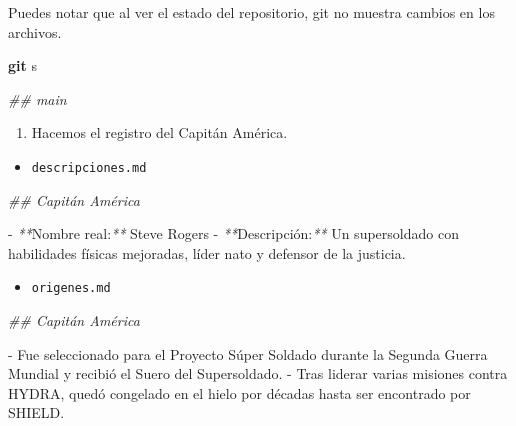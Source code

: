 \documentclass[
]{book}
\newenvironment{Shaded}{\begin{snugshade}}{\end{snugshade}}
\newcommand{\CommentTok}[1]{\textcolor[rgb]{0.56,0.35,0.01}{\textit{#1}}}
\newcommand{\ExtensionTok}[1]{#1}
\newcommand{\FunctionTok}[1]{\textcolor[rgb]{0.13,0.29,0.53}{\textbf{#1}}}
\newcommand{\NormalTok}[1]{#1}
\newcommand{\PreprocessorTok}[1]{\textcolor[rgb]{0.56,0.35,0.01}{\textit{#1}}}
\providecommand{\tightlist}{%
  \setlength{\itemsep}{0pt}\setlength{\parskip}{0pt}}
\begin{document}
Puedes notar que al ver el estado del repositorio, git no muestra cambios en los archivos.

\begin{Shaded}
\begin{Highlighting}[]
\FunctionTok{git}\NormalTok{ s}
\end{Highlighting}
\end{Shaded}

\begin{Shaded}
\begin{Highlighting}[]
\CommentTok{\#\# main}
\end{Highlighting}
\end{Shaded}

\begin{enumerate}
\def\labelenumi{\arabic{enumi}.}
\setcounter{enumi}{1}
\tightlist
\item
  Hacemos el registro del Capitán América.
\end{enumerate}

\begin{itemize}
\tightlist
\item
  \texttt{descripciones.md}
\end{itemize}

\begin{Shaded}
\begin{Highlighting}[]
\CommentTok{\#\# Capitán América}

\ExtensionTok{{-}} \PreprocessorTok{**}\NormalTok{Nombre real:}\PreprocessorTok{**}\NormalTok{ Steve Rogers}
\ExtensionTok{{-}} \PreprocessorTok{**}\NormalTok{Descripción:}\PreprocessorTok{**}\NormalTok{ Un supersoldado con habilidades físicas mejoradas, líder nato y defensor de la justicia.}
\end{Highlighting}
\end{Shaded}

\begin{itemize}
\tightlist
\item
  \texttt{origenes.md}
\end{itemize}

\begin{Shaded}
\begin{Highlighting}[]
\CommentTok{\#\# Capitán América}

\ExtensionTok{{-}}\NormalTok{ Fue seleccionado para el Proyecto Súper Soldado durante la Segunda Guerra Mundial y recibió el Suero del Supersoldado.}
\ExtensionTok{{-}}\NormalTok{ Tras liderar varias misiones contra HYDRA, quedó congelado en el hielo por décadas hasta ser encontrado por SHIELD.}
\end{Highlighting}
\end{Shaded}
\end{document}
